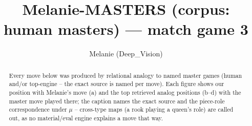 \documentclass[11pt]{article}
\title{Melanie-MASTERS (corpus: human masters) — match game 3}
\author{Melanie (Deep\_Vision)}
\date{}
\begin{document}
\maketitle

\begin{abstract}Every move below was produced by relational analogy to named master games (human and/or top-engine -- the exact source is named per move). Each figure shows our position with Melanie's move (a) and the top retrieved analog positions (b--d) with the master move played there; the caption names the exact source and the piece-role correspondence under $\mu$ -- cross-type maps (a rook playing a queen's role) are called out, as no material/eval engine explains a move that way.\end{abstract}

\begin{figure}[p]\centering
\begin{subfigure}{0.46\textwidth}\centering
\resizebox{\linewidth}{!}{%
\newchessgame
\chessboard[
  setfen={r2qk2r/1bp2ppp/pbnp1n2/1p2p3/3PP3/1BP2N2/PP3PPP/RNBQR1K1 w kq - 1 10},
  showmover=false,
  pgfstyle=straightmove, color=movearrow, markmove={f3-g5}
]}
\caption{}
\end{subfigure}\hfill
\begin{subfigure}{0.46\textwidth}\centering
\resizebox{\linewidth}{!}{%
\newchessgame
\chessboard[
  setfen={r2qr1k1/1bp1bppp/p1np1n2/1p2p3/3PP3/1BP2N1P/PP3PP1/RNBQR1K1 w - - 1 11},
  showmover=false,
  pgfstyle=straightmove, color=movearrow, markmove={f3-g5}
]}
\caption{}
\end{subfigure}
\\[4pt]
\begin{subfigure}{0.46\textwidth}\centering
\resizebox{\linewidth}{!}{%
\newchessgame
\chessboard[
  setfen={r2qk2r/1bp2pp1/pbnp1n1p/1p2p3/P2PP3/1BP2N2/1P3PPP/RNBQR1K1 w kq - 0 11},
  showmover=false,
  pgfstyle=straightmove, color=movearrow, markmove={d4-d5}
]}
\caption{}
\end{subfigure}\hfill
\begin{subfigure}{0.46\textwidth}\centering
\resizebox{\linewidth}{!}{%
\newchessgame
\chessboard[
  setfen={r1bqr1k1/2p2ppp/pbnp1n2/1p2p3/3PP3/1BP2N1P/PP3PP1/RNBQR1K1 w - - 1 11},
  showmover=false,
  pgfstyle=straightmove, color=movearrow, markmove={d4-e5}
]}
\caption{}
\end{subfigure}

\end{figure}
\end{document}
